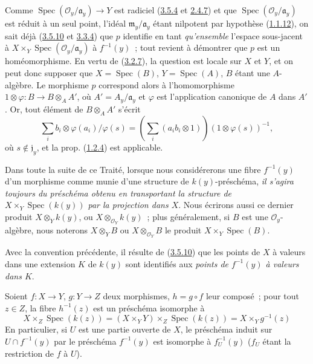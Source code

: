 Comme $\operatorname{Spec}(\mathcal{O}_y/\mathfrak{a}_y)\to Y$ est radiciel
(\hyperref[I.3.5.4-fr]{3.5.4} et \hyperref[I.2.4.7-fr]{2.4.7}) et que
$\operatorname{Spec}(\mathcal{O}_y/\mathfrak{a}_y)$ est réduit à un seul
point, l'idéal $\mathfrak{m}_y/\mathfrak{a}_y$ étant nilpotent par hypothèse
(\hyperref[I.1.1.12-fr]{1.1.12}), on sait déjà
(\hyperref[I.3.5.10-fr]{3.5.10} et \hyperref[I.3.3.4-fr]{3.3.4}) que $p$
identifie en tant \emph{qu'ensemble} l'espace sous-jacent à
$X\times_Y\operatorname{Spec}(\mathcal{O}_y/\mathfrak{a}_y)$ à $f^{-1}(y)$~;
tout revient à démontrer que $p$ est un homéomorphisme. En vertu de
(\hyperref[I.3.2.7-fr]{3.2.7}), la question est locale sur $X$ et $Y$, et on
peut donc supposer que $X=\operatorname{Spec}(B)$,
$Y=\operatorname{Spec}(A)$, $B$ étant une $A$-algèbre. Le morphisme $p$
correspond alors à l'homomorphisme
$1\otimes\varphi:B\to B\otimes_A A'$, où $A'=A_y/\mathfrak{a}_y$ et
$\varphi$ est l'application canonique de $A$ dans $A'$. Or, tout élément de
$B\otimes_A A'$ s'écrit
\label{I.3.6.1.localization-fraction-fr}
\[
  \sum_i b_i\otimes\varphi(a_i)/\varphi(s)
  =\left(\sum_i(a_i b_i\otimes 1)\right)(1\otimes\varphi(s))^{-1},
\]
où $s\notin\mathfrak{j}_y$, et la prop.
(\hyperref[I.1.2.4-fr]{1.2.4}) est applicable.

\begin{env}[3.6.2]
\label{I.3.6.2-fr}
Dans toute la suite de ce Traité, lorsque nous considérerons une fibre
$f^{-1}(y)$ d'un morphisme comme munie d'une structure de $k(y)$-préschéma,
\emph{il s'agira toujours du préschéma obtenu en transportant la structure de
$X\times_Y\operatorname{Spec}(k(y))$ par la projection dans $X$}. Nous
écrirons aussi ce dernier produit $X\otimes_Y k(y)$, ou
$X\otimes_{\mathcal{O}_Y}k(y)$~; plus généralement, si $B$ est une
$\mathcal{O}_y$-algèbre, nous noterons $X\otimes_Y B$ ou
$X\otimes_{\mathcal{O}_Y}B$ le produit
$X\times_Y\operatorname{Spec}(B)$.
\end{env}

Avec la convention précédente, il résulte de
(\hyperref[I.3.5.10-fr]{3.5.10}) que les points de $X$ à valeurs dans une
extension $K$ de $k(y)$ sont identifiés aux \emph{points de $f^{-1}(y)$ à
valeurs dans $K$}.

\begin{env}[3.6.3]
\label{I.3.6.3-fr}
Soient $f:X\to Y$, $g:Y\to Z$ deux morphismes, $h=g\circ f$ leur composé~;
pour tout $z\in Z$, la fibre $h^{-1}(z)$ est un préschéma isomorphe à
\label{I.3.6.3.fibre-composition-fr}
\[
  X\times_Z\operatorname{Spec}(k(z))
  =(X\times_Y Y)\times_Z\operatorname{Spec}(k(z))
  =X\times_Y g^{-1}(z)
\]
En particulier, si $U$ est une partie ouverte de $X$, le préschéma induit sur
$U\cap f^{-1}(y)$ par le préschéma $f^{-1}(y)$ est isomorphe à
$f_U^{-1}(y)$ ($f_U$ étant la restriction de $f$ à $U$).
\end{env}

